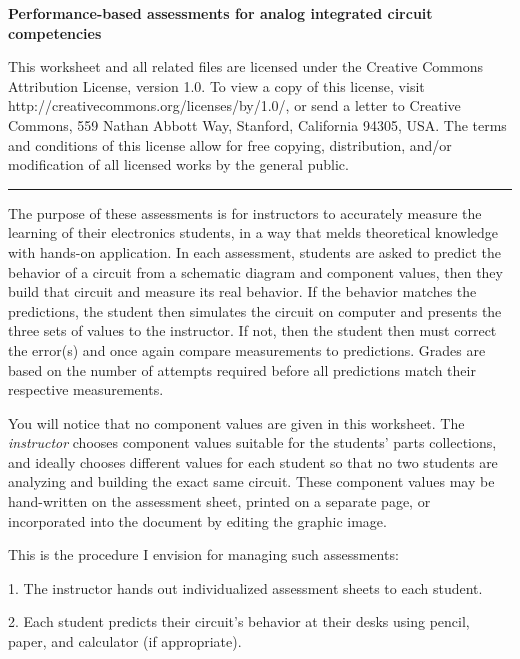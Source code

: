 
\centerline{\bf Performance-based assessments for analog integrated circuit competencies} \bigskip 
 
This worksheet and all related files are licensed under the Creative Commons Attribution License, version 1.0.  To view a copy of this license, visit http://creativecommons.org/licenses/by/1.0/, or send a letter to Creative Commons, 559 Nathan Abbott Way, Stanford, California 94305, USA.  The terms and conditions of this license allow for free copying, distribution, and/or modification of all licensed works by the general public.

\bigskip 

\hrule

\vskip 10pt

The purpose of these assessments is for instructors to accurately measure the learning of their electronics students, in a way that melds theoretical knowledge with hands-on application.  In each assessment, students are asked to predict the behavior of a circuit from a schematic diagram and component values, then they build that circuit and measure its real behavior.  If the behavior matches the predictions, the student then simulates the circuit on computer and presents the three sets of values to the instructor.  If not, then the student then must correct the error(s) and once again compare measurements to predictions.  Grades are based on the number of attempts required before all predictions match their respective measurements.

You will notice that no component values are given in this worksheet.  The {\it instructor} chooses component values suitable for the students' parts collections, and ideally chooses different values for each student so that no two students are analyzing and building the exact same circuit.  These component values may be hand-written on the assessment sheet, printed on a separate page, or incorporated into the document by editing the graphic image.

\vskip 10pt

\noindent
This is the procedure I envision for managing such assessments:

\vskip 10pt

\item{1.} The instructor hands out individualized assessment sheets to each student.

\item{2.} Each student predicts their circuit's behavior at their desks using pencil, paper, and calculator (if appropriate).

